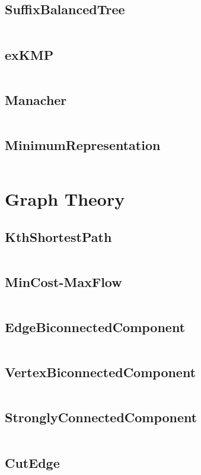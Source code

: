  \subsection{SuffixBalancedTree}
    \inputminted{cpp}{src/5_String/3_SuffixBalancedTree.cpp}
  \subsection{exKMP}
    \inputminted{cpp}{src/5_String/4_exKMP.cpp}
  \subsection{Manacher}
    \inputminted{cpp}{src/5_String/5_Manacher.cpp}
  \subsection{MinimumRepresentation}
    \inputminted{cpp}{src/5_String/6_MinimumRepresentation.cpp}
\section{Graph Theory}
  \subsection{KthShortestPath}
    \inputminted{cpp}{src/6_Graph Theory/10_KthShortestPath.cpp}
  \subsection{MinCost-MaxFlow}
    \inputminted{cpp}{src/6_Graph Theory/11_MinCost-MaxFlow.cpp}
  \subsection{EdgeBiconnectedComponent}
    \inputminted{cpp}{src/6_Graph Theory/1_EdgeBiconnectedComponent.cpp}
  \subsection{VertexBiconnectedComponent}
    \inputminted{cpp}{src/6_Graph Theory/2_VertexBiconnectedComponent.cpp}
  \subsection{StronglyConnectedComponent}
    \inputminted{cpp}{src/6_Graph Theory/3_StronglyConnectedComponent.cpp}
  \subsection{CutEdge}
    \inputminted{cpp}{src/6_Graph Theory/4_CutEdge.cpp}
